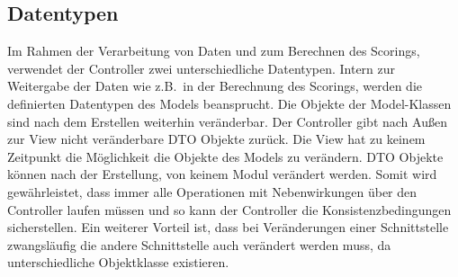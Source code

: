 \subsection{Datentypen}\label{subsec:datentypen}
Im Rahmen der Verarbeitung von Daten und zum Berechnen des Scorings, verwendet der Controller zwei unterschiedliche Datentypen.
Intern zur Weitergabe der Daten wie z.B.\ in der Berechnung des Scorings, werden die definierten Datentypen des Models beansprucht.
Die Objekte der Model-Klassen sind nach dem Erstellen weiterhin veränderbar.
Der Controller gibt nach Außen zur View nicht veränderbare DTO Objekte zurück.
Die View hat zu keinem Zeitpunkt die Möglichkeit die Objekte des Models zu verändern.
DTO Objekte können nach der Erstellung, von keinem Modul verändert werden.
Somit wird gewährleistet,
dass immer alle Operationen mit Nebenwirkungen über den Controller laufen müssen und so kann der Controller
die Konsistenzbedingungen sicherstellen.
Ein weiterer Vorteil ist,
dass bei Veränderungen einer Schnittstelle
zwangsläufig die andere Schnittstelle auch verändert werden muss,
da unterschiedliche Objektklasse existieren.

